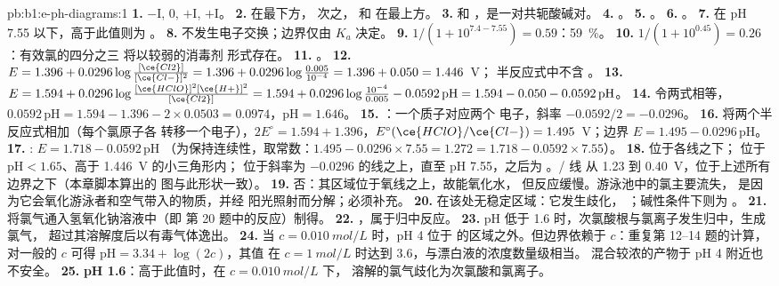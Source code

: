 \begin{solution}{pb:b1:e-ph-diagrams:1}
\textbf{1.} $-$I, 0, $+$I, $+$I。
\textbf{2.}  在最下方， 次之，
 和  在最上方。
\textbf{3.}  和 ，是一对共轭酸碱对。
\textbf{4.} 。
\textbf{5.} 。
\textbf{6.} 。
\textbf{7.}  在 pH 7.55 以下，高于此值则为 。
\textbf{8.} 不发生电子交换；边界仅由 $K_a$ 决定。
\textbf{9.} $1/(1 + 10^{7.4 - 7.55}) = 0.59$：\qty{59}{\percent}。
\textbf{10.} $1/(1 + 10^{0.45}) = 0.26$：有效氯的四分之三
将以较弱的消毒剂  形式存在。
\textbf{11.} 。
\textbf{12.} $E = 1.396 + 0.0296\log\frac{[\ce{Cl2}]}{[\ce{Cl-}]^2} = 1.396
+ 0.0296\log\frac{0.005}{10^{-4}} = 1.396 + 0.050 = 1.446$~V；
半反应式中不含 。
\textbf{13.} $E = 1.594 + 0.0296\log\frac{[\ce{HClO}]^2[\ce{H+}]^2}{[\ce{Cl2}]}
= 1.594 + 0.0296\log\frac{10^{-4}}{0.005} - 0.0592\,\mathrm{pH} = 1.594 -
0.050 - 0.0592\,\mathrm{pH}$。
\textbf{14.} 令两式相等，$0.0592\,\mathrm{pH} = 1.594 - 1.396 - 2 \times 0.0503
= 0.0974$，$\mathrm{pH} = 1.646$。
\textbf{15.} ：一个质子对应两个
电子，斜率 $-0.0592/2 = -0.0296$。
\textbf{16.} 将两个半反应式相加（每个氯原子各
转移一个电子），$2E^\circ = 1.594 + 1.396$，$E^\circ(\ce{HClO}/\ce{Cl-}) =
1.495$~V；边界 $E = 1.495 - 0.0296\,\mathrm{pH}$。
\textbf{17.} : $E = 1.718 - 0.0592\,\mathrm{pH}$
（为保持连续性，取常数：$1.495 - 0.0296 \times 7.55 = 1.272 = 1.718
- 0.0592 \times 7.55$）。
\textbf{18.}  位于各线之下； 位于
$\mathrm{pH} < 1.65$、高于 1.446~V 的小三角形内； 位于斜率为
$-0.0296$ 的线之上，直至 pH 7.55，之后为 。/ 线
从 1.23 到 0.40~V，位于上述所有边界之下（本章脚本算出的
图与此形状一致）。
\textbf{19.} 否：其区域位于氧线之上，故能氧化水，
但反应缓慢。游泳池中的氯主要流失，
是因为它会氧化游泳者和空气带入的物质，并经
阳光照射而分解；必须补充。
\textbf{20.}  在该处无稳定区域：它发生歧化，
；碱性条件下则为
。
\textbf{21.} 将氯气通入氢氧化钠溶液中（即
第 20 题中的反应）制得。
\textbf{22.} ，属于归中反应。
\textbf{23.} pH 低于 1.6 时，次氯酸根与氯离子发生归中，生成氯气，
超过其溶解度后以有毒气体逸出。
\textbf{24.} 当 $c = \qty{0.010}{mol/L}$ 时，pH 4 位于
 的区域之外。但边界依赖于 $c$：重复第 12--14 题的计算，
对一般的 $c$ 可得 $\mathrm{pH} = 3.34 + \log(2c)$，其值
在 $c = \qty{1}{mol/L}$ 时达到 3.6，与漂白液的浓度数量级相当。
混合较浓的产物于 pH 4 附近也不安全。
\textbf{25.} \textbf{pH 1.6}：高于此值时，在 $c = \qty{0.010}{mol/L}$ 下，
溶解的氯气歧化为次氯酸和氯离子。
\end{solution}
